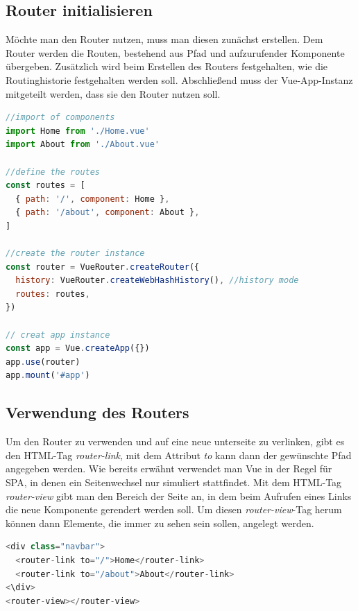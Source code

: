 \subsection*{Router initialisieren}
Möchte man den Router nutzen, muss man diesen zunächst erstellen.
Dem Router werden die Routen, bestehend aus Pfad und aufzurufender Komponente übergeben.
Zusätzlich wird beim Erstellen des Routers festgehalten, wie die Routinghistorie festgehalten werden soll.
Abschließend muss der Vue-App-Instanz mitgeteilt werden, dass sie den Router nutzen soll. \cite{vueRouterGettingStarted}
\begin{lstlisting}[caption={Router initialisieren},language=javascript, label={lst:Router-initialisieren}]
//import of components
import Home from './Home.vue'
import About from './About.vue'

//define the routes
const routes = [
  { path: '/', component: Home },
  { path: '/about', component: About },
]

//create the router instance
const router = VueRouter.createRouter({
  history: VueRouter.createWebHashHistory(), //history mode
  routes: routes,
})

// creat app instance
const app = Vue.createApp({})
app.use(router)
app.mount('#app')
\end{lstlisting}

\subsection*{Verwendung des Routers}
Um den Router zu verwenden und auf eine neue unterseite zu verlinken,
gibt es den HTML-Tag \emph{router-link}, mit dem Attribut \emph{to} kann dann der gewünschte Pfad angegeben werden.
Wie bereits erwähnt verwendet man Vue in der Regel für SPA, in denen ein Seitenwechsel nur simuliert stattfindet.
Mit dem HTML-Tag \emph{router-view} gibt man den Bereich der Seite an, in dem beim Aufrufen eines Links die neue Komponente gerendert werden soll.
Um diesen \emph{router-view}-Tag herum können dann Elemente, die immer zu sehen sein sollen, angelegt werden. \cite{vueRouterGettingStarted}

\begin{lstlisting}[caption={Verwendung des Routers},language=javascript,label={lst:Verwendung-des-Routers}]
<div class="navbar">
  <router-link to="/">Home</router-link>
  <router-link to="/about">About</router-link>
<\div>
<router-view></router-view>
\end{lstlisting}

